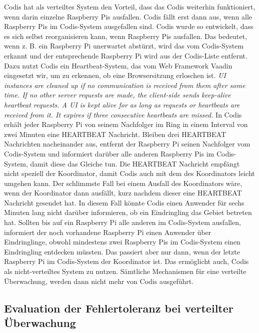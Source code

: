 \documentclass[journal]{IEEEtran}
\begin{document}
Codis hat als verteiltes System den Vorteil, dass das Codis weiterhin funktioniert, wenn darin einzelne Raspberry Pis ausfallen. Codis fällt erst dann aus, wenn alle Raspberry Pis im Codis-System ausgefallen sind. Codis wurde so entwickelt, dass es sich selbst reorganisieren kann, wenn Raspberry Pis ausfallen. Das bedeutet, wenn z. B. ein Raspberry Pi unerwartet abstürzt, wird das vom Codis-System erkannt und der entsprechende Raspberry Pi wird aus der Codis-Liste entfernt. Dazu nutzt Codis ein Heartbeat-System, das vom Web Framework Vaadin eingesetzt wir, um zu erkennen, ob eine Browsersitzung erloschen ist. \textit{UI instances are cleaned up if no communication is received from them after some time. If no other server requests are made, the client-side sends keep-alive heartbeat requests. A UI is kept alive for as long as requests or heartbeats are received from it. It expires if three consecutive heartbeats are missed.}\cite[S. 95]{vaadin} In Codis erhält jeder Raspberry Pi von seinem Nachfolger im Ring in einem Interval von zwei Minuten eine \MakeUppercase{heartbeat} Nachricht. Bleiben drei \MakeUppercase{heartbeat} Nachrichten nacheinander aus, entfernt der Raspberry Pi seinen Nachfolger vom Codis-System und informiert darüber alle anderen Raspberry Pis im Codis-System, damit diese das Gleiche tun. Die \MakeUppercase{heartbeat} Nachricht empfängt nicht speziell der Koordinator, damit Codis auch mit dem des Koordinators leicht umgehen kann. Der schlimmste Fall bei einem Ausfall des Koordinators wäre, wenn der Koordinator dann ausfällt, kurz nachdem dieser eine \MakeUppercase{heartbeat} Nachricht gesendet hat. In diesem Fall könnte Codis einen Anwender für sechs Minuten lang nicht darüber informieren, ob ein Eindringling das Gebiet betreten hat. Sollten bis auf ein Raspberry Pi alle anderen im Codis-System ausfallen, informiert der noch vorhandene Raspberry Pi einen Anwender über Eindringlinge, obwohl mindestens zwei Raspberry Pis im Codis-System einen Eindringling entdecken müssten. Das passiert aber nur dann, wenn der letzte Raspberry Pi im Codis-System der Koordinator ist. Das ermöglicht auch, Codis als nicht-verteiltes System zu nutzen. Sämtliche Mechanismen für eine verteilte Überwachung, werden dann nicht mehr von Codis ausgeführt.

\subsection{Evaluation der Fehlertoleranz bei verteilter Überwachung}
\end{document}
